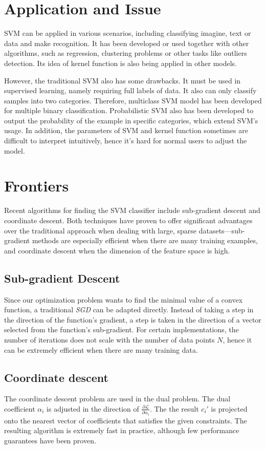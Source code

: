 \documentclass{article}
\begin{document}
\section{Application and Issue}
SVM can be applied in various scenarios, including classifying imagine, text or data and make recognition. It has been developed or used together with other algorithms, such as regression, clustering problems or other tasks like outliers detection. Its idea of kernel function is also being applied in other models. 
\par However, the traditional SVM also has some drawbacks. It must be used in supervised learning, namely requiring full labels of data. It also can only classify samples into two categories. Therefore, multiclass SVM model has been developed for multiple binary classification. Probabilistic SVM also has been developed to output the probability of the example in specific categories, which extend SVM's usage. In addition, the parameters of SVM and kernel function sometimes are difficult to interpret intuitively, hence it's hard for normal users to adjust the model.
\section{Frontiers}
Recent algorithms for finding the SVM classifier include sub-gradient descent and coordinate descent. Both techniques have proven to offer significant advantages over the traditional approach when dealing with large, sparse datasets—sub-gradient methods are especially efficient when there are many training examples, and coordinate descent when the dimension of the feature space is high. 
\subsection{Sub-gradient Descent}
Since our optimization problem wants to find the minimal value of a convex function, a traditional \emph{SGD} can be adapted directly\cite{5}. Instead of taking a step in the direction of the function's gradient, a step is taken in the direction of a vector selected from the function's sub-gradient. For certain implementations, the number of iterations does not scale with the number of data points $N$, hence it can be extremely efficient when there are many training data.
\subsection{Coordinate descent}
The coordinate descent problem are used in the dual problem. The dual coefficient $\alpha_i$ is adjusted in the direction of $\frac{\partial\mathcal{L}}{\partial \alpha_i}.$ The the result $c_i'$ is projected onto the nearest vector of coefficients that satisfies the given constraints. The resulting algorithm is extremely fast in practice, although few performance guarantees have been proven\cite{6}.
\end{document}
